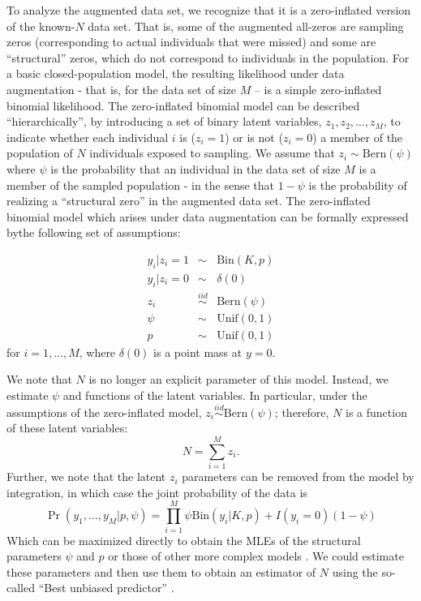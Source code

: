 To analyze the augmented data set, we recognize that it is a
zero-inflated version of the known-$N$ data set. That is, some of the
augmented all-zeros are sampling zeros (corresponding to actual
individuals that were missed) and some are ``structural'' zeros, which
do not correspond to individuals in the population. For a basic
closed-population model, the resulting likelihood under data
augmentation - that is, for the data set of size $M$ -- is a simple
zero-inflated binomial likelihood.  The zero-inflated binomial model
can be described ``hierarchically'', by introducing a set of binary
latent variables, $z_{1},z_{2},\ldots, z_{M}$, to indicate whether
each individual $i$ is ($z_i=1$) or is not ($z_i=0$) a member of the
population of $N$ individuals exposed to sampling. We assume that
$z_{i} \sim \mbox{Bern}(\psi)$ where $\psi$ is the probability that an
individual in the data set of size $M$ is a member of the sampled
population - in the sense that $1-\psi$ is the probability of
realizing a ``structural zero'' in the augmented data set.  The
zero-inflated binomial model which arises under data augmentation can
be formally expressed bythe following set of assumptions:

\begin{eqnarray*}
 y_{i}|{z_{i}=1} & \sim  &\mbox{Bin}(K, p) \\
 y_{i}|{z_{i}=0} & \sim &  \delta(0)  \\
 z_{i} & \stackrel{iid}{\sim} & \mbox{Bern}(\psi) \\
 \psi & \sim & \mathrm{Unif}(0,1) \\
 p & \sim & \mathrm{Unif}(0,1)
\end{eqnarray*}
for $i=1, \ldots, M$, where $\delta(0)$ is a point mass at $y=0$.

We note that $N$ is no longer an explicit parameter of this
model. Instead, we estimate $\psi$ and functions of the latent
variables. In particular, under the assumptions of the zero-inflated
model, $z_{i} \stackrel{iid}{\sim} \mbox{Bern}(\psi)$; therefore, $N$
is a function of these latent variables:
 \[
 N = \sum_{i=1}^{M} z_{i}.
\]
Further, we note that the latent $z_i$ parameters can be removed from
the model by integration, in which case the joint probability of the
data is
\begin{equation}
  \Pr(y_1, \ldots, y_M | p, \psi) = \prod_{i=1}^M  \psi \mathrm{Bin}(y_i | K, p) +  I(y_i=0) (1-\psi)
\end{equation}
Which can be maximized directly to obtain the MLEs of the structural
parameters $\psi$ and $p$ or those of other more complex models
\citep[e.g., see][]{royle:2006}. We could estimate these parameters
and then use them to obtain an estimator of $N$ using the so-called
``Best unbiased predictor'' \citep[see][]{royle_dorazio:2011}.

